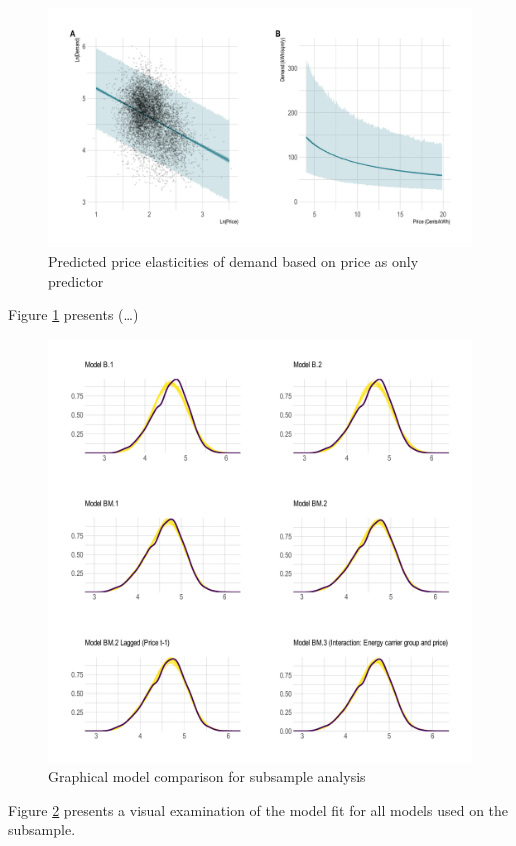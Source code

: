 \documentclass[12pt,twoside]{reedthesis}
\begin{document}
\newpage
\begin{figure}

{\centering \includegraphics[width=1\linewidth]{figure/b1_prediction} 

}

\caption{Predicted price elasticities of demand based on price as only predictor}\label{fig:elasticity-predictions-b1}
\end{figure}
\noindent
Figure \ref{fig:elasticity-predictions-b1} presents (\ldots)

\newpage
\begin{figure}

{\centering \includegraphics[width=1\linewidth]{figure/plot-model-comparison} 

}

\caption{Graphical model comparison for subsample analysis}\label{fig:plot-model-comparison}
\end{figure}
\noindent
Figure \ref{fig:plot-model-comparison} presents a visual examination of the model fit for all models used on the subsample.
\end{document}

